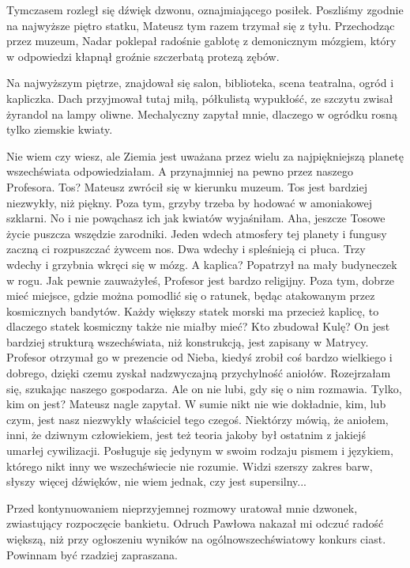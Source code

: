 Tymczasem rozległ się dźwięk dzwonu, oznajmiającego posiłek.
Poszliśmy zgodnie na najwyższe piętro statku, Mateusz tym razem trzymał się z tyłu.
Przechodząc przez muzeum, Nadar poklepał radośnie gablotę z demonicznym mózgiem, który w odpowiedzi kłapnął groźnie szczerbatą protezą zębów.

Na najwyższym piętrze, znajdował się salon, biblioteka, scena teatralna, ogród i kapliczka.
Dach przyjmował tutaj miłą, półkulistą wypukłość, ze szczytu zwisał żyrandol na lampy oliwne.
Mechalyczny zapytał mnie, dlaczego w ogródku rosną tylko ziemskie kwiaty.

\begin{dialogue}
\ds{} Nie wiem czy wiesz, ale Ziemia jest uważana przez wielu za najpiękniejszą planetę wszechświata \dm{} odpowiedziałam. \dm{}
A przynajmniej na pewno przez naszego Profesora.
\ds{} Tos? \dm{} Mateusz zwrócił się w kierunku muzeum.
\ds{} Tos jest bardziej niezwykły, niż piękny. Poza tym, grzyby trzeba by hodować w amoniakowej szklarni.
No i nie powąchasz ich jak kwiatów \ds{} wyjaśniłam. \dm{} Aha, jeszcze Tosowe życie puszcza wszędzie zarodniki. 
Jeden wdech atmosfery tej planety i fungusy zaczną ci rozpuszczać żywcem nos. Dwa wdechy i spleśnieją ci płuca. Trzy wdechy i grzybnia wkręci się w mózg.
\ds{} A kaplica? \dm{} Popatrzył na mały budyneczek w rogu.
\ds{} Jak pewnie zauważyłeś, Profesor jest bardzo religijny. Poza tym, dobrze mieć miejsce, gdzie można pomodlić się o ratunek, będąc atakowanym przez kosmicznych bandytów. 
Każdy większy statek morski ma przecież kaplicę, to dlaczego statek kosmiczny także nie miałby mieć? 
\ds{} Kto zbudował Kulę?
\ds{} On jest bardziej strukturą wszechświata, niż konstrukcją, jest zapisany w Matrycy. 
Profesor otrzymał go w prezencie od Nieba, kiedyś zrobił coś bardzo wielkiego i dobrego, dzięki czemu zyskał nadzwyczajną przychylność aniołów. \dm{}
Rozejrzałam się, szukając naszego gospodarza. \dm{}
Ale on nie lubi, gdy się o nim rozmawia.
\ds{} Tylko, kim on jest? \dm{} Mateusz nagle zapytał.
\ds{} W sumie nikt nie wie dokładnie, kim, lub czym, jest nasz niezwykły właściciel tego czegoś. 
Niektórzy mówią, że aniołem, inni, że dziwnym człowiekiem,
jest też teoria jakoby był ostatnim z jakiejś umarłej cywilizacji. 
Posługuje się jedynym w swoim rodzaju pismem i językiem, którego nikt inny we wszechświecie nie rozumie.
Widzi szerszy zakres barw, słyszy więcej dźwięków, nie wiem jednak, czy jest supersilny...
\end{dialogue}

Przed kontynuowaniem nieprzyjemnej rozmowy uratował mnie dzwonek, zwiastujący rozpoczęcie bankietu.
Odruch Pawłowa nakazał mi odczuć radość większą, niż przy ogłoszeniu wyników na ogólnowszechświatowy konkurs ciast. 
Powinnam być rzadziej zapraszana.

